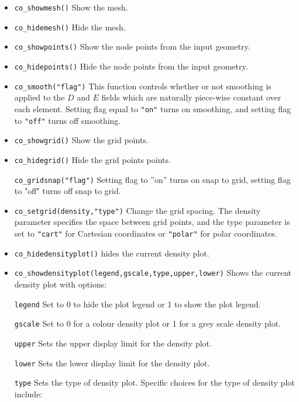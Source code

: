 \begin{itemize}
\item \texttt{co\_showmesh()} Show the mesh.

\item \texttt{co\_hidemesh()} Hide the mesh.

\item \texttt{co\_showpoints()} Show the node points from the input geometry.

\item \texttt{co\_hidepoints()} Hide the node points from the input geometry.

\item \texttt{co\_smooth("flag")} This function controls whether or not smoothing is
applied to the $D$ and $E$ fields which are naturally piece-wise
constant over each element. Setting flag equal to \texttt{"on"}
turns on smoothing, and setting flag to \texttt{"off"} turns off
smoothing.

\item \texttt{co\_showgrid()} Show the grid points.

\item \texttt{co\_hidegrid()} Hide the grid points points.

\texttt{co\_gridsnap("flag")} Setting flag to ''on'' turns on snap to grid,
setting flag to "off" turns off snap to grid.

\item \texttt{co\_setgrid(density,"type")} Change the grid spacing. The density
parameter specifies the space between grid points, and the type
parameter is set to \texttt{"cart"} for Cartesian coordinates or
\texttt{"polar"} for polar coordinates.

\item \texttt{co\_hidedensityplot()} hides the current density plot.

\item \texttt{co\_showdensityplot(legend,gscale,type,upper,lower)} Shows the
current density plot with options:

\texttt{legend} Set to 0 to hide the plot legend or 1 to show the plot
legend.

\texttt{gscale} Set to 0 for a colour density plot or 1 for a grey scale
density plot.

\texttt{upper} Sets the upper display limit for the density plot.

\texttt{lower} Sets the lower display limit for the density plot.

\texttt{type} Sets the type of density plot. Specific choices for the type of density plot include:


\end{itemize}
